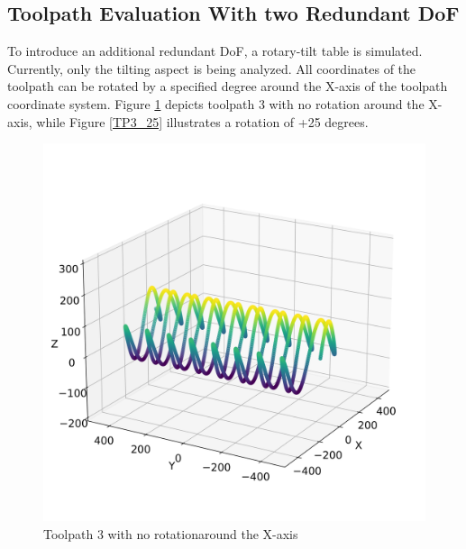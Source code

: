 \newpage

\subsection{Toolpath Evaluation With two Redundant DoF}\label{2RDOF}

To introduce an additional redundant \acrshort{DoF}, a rotary-tilt table is simulated. Currently, only the tilting aspect is being analyzed. All coordinates of the toolpath can be rotated by a specified degree around the X-axis of the toolpath coordinate system. Figure \ref{TP3_0} depicts toolpath 3 with no rotation around the X-axis, while Figure \ref{TP3_25} illustrates a rotation of +25 degrees.

\begin{figure}[H]%
	\centering
	\begin{minipage}{0.5\textwidth}
		\includegraphics[width=\textwidth]{figures/path3_kipp_0.png}
		\caption{Toolpath 3 with no rotation\newline around the X-axis}
		\label{TP3_0}
	\end{minipage}\hfill
	\begin{minipage}{0.5\textwidth}

\end{minipage}
\end{figure}
